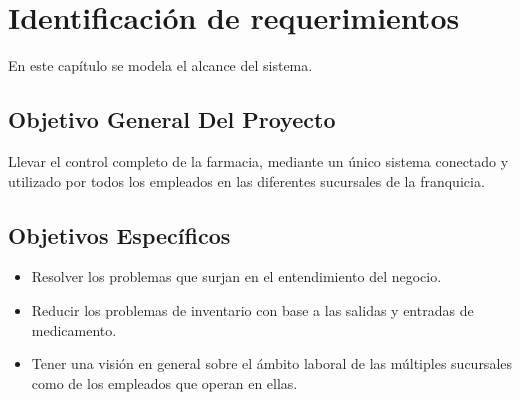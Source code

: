 \chapter{Identificación de requerimientos}
\label{cap:reqUsr}

	En este capítulo se modela el alcance del sistema.
	

\section{Objetivo General Del Proyecto}
Llevar  el  control  completo  de  la  farmacia,  mediante  un   único  sistema  conectado  y utilizado por todos los empleados en las diferentes sucursales de la franquicia.
\section{Objetivos Específicos}
\begin{itemize}
\item Resolver los problemas que surjan en el entendimiento del negocio.

\item Reducir los problemas de inventario con base a las salidas  y entradas de medicamento.

\item Tener una visión en general sobre el ámbito laboral de las múltiples sucursales como de los empleados que operan en ellas.

\end{itemize}

